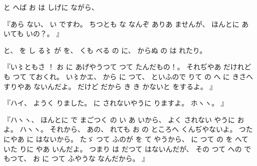 %
と
へば
お
は
しげに
ながら、

%
『あら
ない、
%
い
ですわ。
%
ちつとも
な
なんぞ
ありあ
ませんが、
%
ほんとに
あ
いても%
いの？。
』

%
と、
%
を
し
る〻%
が
を、
%
くも
べる
の
に、
%
からぬ
の
は%
れたり。

%
『い〻ともさ%
！\inhibitglue{}%
お
に
あげやうつて
つて
たんだもの！。
%
それぢやあ
だけれども
つて
ておくれ。
%
い〻かエ、%
%
から
に%
つて、
%
といふので
りて
の
へ
に
きさへすりやあ
ないんだよ。
%
だけど
だから
き
き%
かないと
をするよ。
』

%
『ハイ、
%
ようく
りました。
%
に
されないやうに
りますよ。
%
ホヽヽ。
』

%
『ハヽヽ、
%
ほんとに
で
まごつく
の
い
あ
いから、
%
よく
されない
やうに
お
よ。
%
ハヽヽ。
%
それから、
%
あの、
%
れても
お
の
ところへ
くんぢやないよ。
%
つた
にやあ
に
はないから。
%
たゞ%
つて
ふのが
を
て
やうから、
%
に
つて
の
を
へて
いた
りに
やあ
いんだよ。
%
つまり
は
だつて
はないんだが、
%
その
つて
への
で
もつて、
%
お
に
つて
ふやうな
なんだから。
』

